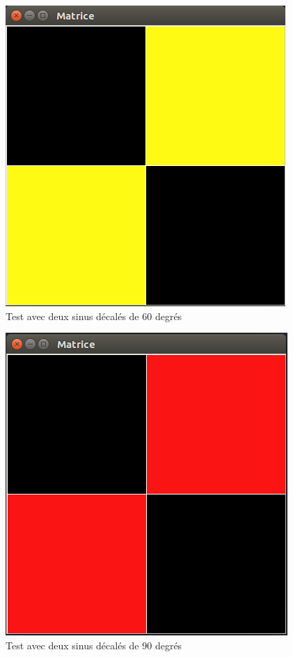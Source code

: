 \begin{figure}[H]
    \centering
    \includegraphics[scale=0.3]{assets/Captures-sinus/PreprocDefaultnormal-60.png}
    \caption{Test avec deux sinus décalés de 60 degrés}
    \label{}
\end{figure}
\begin{figure}[H]
    \centering
    \includegraphics[scale=0.3]{assets/Captures-sinus/PreprocDefaultnormal-90.png}
    \caption{Test avec deux sinus décalés de 90 degrés}
    \label{}
\end{figure}
